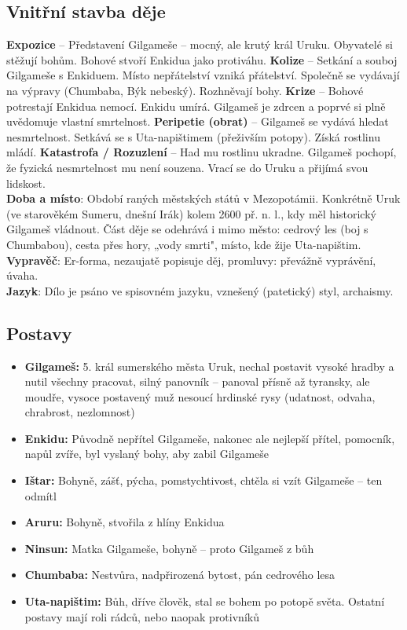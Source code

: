 \documentclass[12pt, a4paper]{article}
\newcommand{\mybf}[1]{\textcolor[RGB]{0, 179, 219}{\textbf{#1}}}
\begin{document}
\subsection*{Vnitřní stavba děje}
\noindent\textbf{Expozice} -- Představení Gilgameše -- mocný, ale krutý král Uruku. Obyvatelé si stěžují bohům. Bohové stvoří Enkidua jako protiváhu.
\noindent\textbf{Kolize} -- Setkání a souboj Gilgameše s Enkiduem. Místo nepřátelství vzniká přátelství. Společně se vydávají na výpravy (Chumbaba, Býk nebeský). Rozhněvají bohy.
\noindent\textbf{Krize} -- Bohové potrestají Enkidua nemocí. Enkidu umírá. Gilgameš je zdrcen a poprvé si plně uvědomuje vlastní smrtelnost.
\noindent\textbf{Peripetie (obrat)} -- Gilgameš se vydává hledat nesmrtelnost. Setkává se s Uta-napištimem (přeživším potopy). Získá rostlinu mládí.
\noindent\textbf{Katastrofa / Rozuzlení} -- Had mu rostlinu ukradne. Gilgameš pochopí, že fyzická nesmrtelnost mu není souzena. Vrací se do Uruku a přijímá svou lidskost.\\[10pt]
\mybf{Doba a místo}: Období raných městských států v Mezopotámii. Konkrétně Uruk (ve starověkém Sumeru, dnešní Irák) kolem 2600 př. n. l., kdy měl historický Gilgameš vládnout. Část děje se odehrává i mimo město: cedrový les (boj s Chumbabou), cesta přes hory, „vody smrti", místo, kde žije Uta-napištim.\\[10pt]
\mybf{Vypravěč}: Er-forma, nezaujatě popisuje děj, promluvy: převážně vyprávění, úvaha.\\[10pt]
\mybf{Jazyk}: Dílo je psáno ve spisovném jazyku, vznešený (patetický) styl, archaismy.\\[10pt]

\subsection*{Postavy}
\begin{itemize}[itemsep=0.3em]
	\item \textbf{Gilgameš:} 5. král sumerského města Uruk, nechal postavit vysoké hradby a nutil všechny pracovat, silný panovník -- panoval přísně až tyransky, ale moudře, vysoce postavený muž nesoucí hrdinské rysy (udatnost, odvaha, chrabrost, nezlomnost)
	\item \textbf{Enkidu:} Původně nepřítel Gilgameše, nakonec ale nejlepší přítel, pomocník, napůl zvíře, byl vyslaný bohy, aby zabil Gilgameše
	\item \textbf{Ištar:} Bohyně, zášť, pýcha, pomstychtivost, chtěla si vzít Gilgameše -- ten odmítl
	\item \textbf{Aruru:} Bohyně, stvořila z hlíny Enkidua
	\item \textbf{Ninsun:} Matka Gilgameše, bohyně -- proto Gilgameš z bůh
	\item \textbf{Chumbaba:} Nestvůra, nadpřirozená bytost, pán cedrového lesa
	\item \textbf{Uta-napištim:} Bůh, dříve člověk, stal se bohem po potopě světa. Ostatní postavy mají roli rádců, nebo naopak protivníků
\end{itemize}
\end{document}
